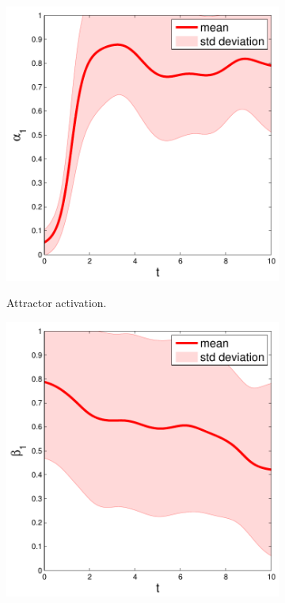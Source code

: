 \begin{figure}%

\begin{subfigure}{.3\linewidth}
  \centering
  \includegraphics[width=\linewidth]{./sections/WP4/pics_serena/alpha1}
  \label{fig:alpha1}
  \caption{Attractor activation.}
\end{subfigure}%
\begin{subfigure}{.3\linewidth}
  \centering
  \includegraphics[width=\linewidth]{./sections/WP4/pics_serena/alpha2}

\end{subfigure}
\end{figure}
